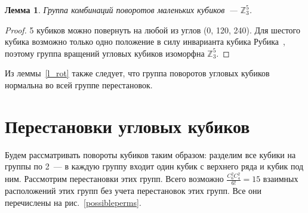 \documentclass[utf8,a4paper,12pt]{article}
\newtheorem{lemma_cub}{Лемма}[section]
\begin{document}
\begin{lemma_cub}
Группа комбинаций поворотов маленьких кубиков~--- $\mathbb{Z}_3^5$.
\end{lemma_cub}
\begin{proof}
	5 кубиков можно повернуть на любой из углов (0\textdegree, 120\textdegree, 240\textdegree). Для шестого кубика возможно только одно положение в силу инварианта кубика Рубика~\cite{dubr}, поэтому группа вращений угловых кубиков изоморфна $\mathbb{Z}_3^5$.
\end{proof}
Из леммы~\ref{l_rot} также следует, что группа поворотов угловых кубиков нормальна во всей группе перестановок.
\section{Перестановки угловых кубиков}
Будем рассматривать повороты кубиков таким образом: разделим все кубики на группы по 2~--- в каждую группу входит один кубик с верхнего ряда и кубик под ним. Рассмотрим перестановки этих групп. Всего возможно $\frac{C^2_6C^2_4}{6!}=15$ взаимных расположений этих групп без учета перестановок этих групп. Все они перечислены на рис.~\ref{possibleperms}.
\end{document}
